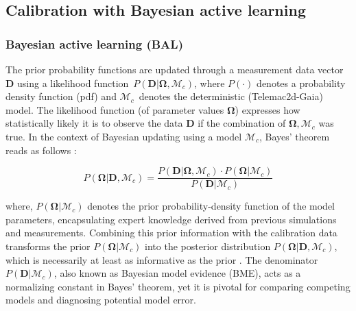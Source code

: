 \documentclass[draft,linenumbers,onecolumn]{agujournal2019} %
\begin{document}
\subsection{Calibration with Bayesian active learning}
\label{sec:bal}

\subsubsection{Bayesian active learning (BAL)}
\label{sec:bal-inference}


The prior probability functions are updated through a measurement data vector  $\mathbf{D}$ using a likelihood function~$P(\mathbf{D} | \mathbf{\Omega} , \mathcal{M}_c)$, where $P(\cdot)$ denotes a probability density function (pdf) and $\mathcal{M}_c$~denotes the deterministic (Telemac2d-Gaia) model. The likelihood function (of parameter values $\mathbf{\Omega}$) expresses how statistically likely it is to observe the data $\mathbf{D}$ if the combination of $\mathbf{\Omega},\mathcal{M}_c$ was true. In the context of Bayesian updating using a model $\mathcal{M}_c$, Bayes' theorem reads as follows \cite{oladyshkin2020bayesian3}: 

\begin{equation} \label{eq:bayes}
	P\left( \mathbf{\Omega} \vert \mathbf{D},\mathcal{M}_c \right) = \frac{P\left( \mathbf{D} \vert \mathbf{\Omega},\mathcal{M}_c \right) \cdot P\left( \mathbf{\Omega}\vert \mathcal{M}_c\right) }{P\left( \mathbf{D}\vert\mathcal{M}_c\right)}
\end{equation}

where, $P(\mathbf{\Omega} \vert \mathcal{M}_c)$ denotes the prior probability-density function of the model parameters, encapsulating expert knowledge derived from previous simulations and measurements. Combining this prior information with the calibration data transforms the prior $P(\mathbf{\Omega} \vert \mathcal{M}_c)$ into the posterior distribution $P(\mathbf{\Omega} \vert \mathbf{D}, \mathcal{M}_c)$, which is necessarily at least as informative as the prior \cite{box1973bayesian,oladyshkin2019connection}. The denominator $P(\mathbf{D} \vert \mathcal{M}_c)$, also known as Bayesian model evidence (BME), acts as a normalizing constant in Bayes' theorem, yet it is pivotal for comparing competing models and diagnosing potential model error.
\end{document}

